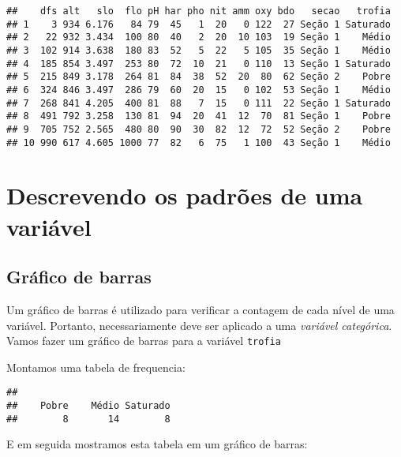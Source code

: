 \documentclass[
]{book}
\newenvironment{Shaded}{\begin{snugshade}}{\end{snugshade}}
\newcommand{\KeywordTok}[1]{\textcolor[rgb]{0.13,0.29,0.53}{\textbf{#1}}}
\newcommand{\NormalTok}[1]{#1}
\newcommand{\OperatorTok}[1]{\textcolor[rgb]{0.81,0.36,0.00}{\textbf{#1}}}
\newcommand{\StringTok}[1]{\textcolor[rgb]{0.31,0.60,0.02}{#1}}
\begin{document}
\begin{verbatim}
##    dfs alt   slo  flo pH har pho nit amm oxy bdo   secao   trofia
## 1    3 934 6.176   84 79  45   1  20   0 122  27 Seção 1 Saturado
## 2   22 932 3.434  100 80  40   2  20  10 103  19 Seção 1    Médio
## 3  102 914 3.638  180 83  52   5  22   5 105  35 Seção 1    Médio
## 4  185 854 3.497  253 80  72  10  21   0 110  13 Seção 1 Saturado
## 5  215 849 3.178  264 81  84  38  52  20  80  62 Seção 2    Pobre
## 6  324 846 3.497  286 79  60  20  15   0 102  53 Seção 1    Médio
## 7  268 841 4.205  400 81  88   7  15   0 111  22 Seção 1 Saturado
## 8  491 792 3.258  130 81  94  20  41  12  70  81 Seção 1    Pobre
## 9  705 752 2.565  480 80  90  30  82  12  72  52 Seção 2    Pobre
## 10 990 617 4.605 1000 77  82   6  75   1 100  43 Seção 1    Médio
\end{verbatim}

\hypertarget{descrevendo-os-padruxf5es-de-uma-variuxe1vel}{%
\section{Descrevendo os padrões de uma variável}\label{descrevendo-os-padruxf5es-de-uma-variuxe1vel}}

\hypertarget{gruxe1fico-de-barras}{%
\subsection{Gráfico de barras}\label{gruxe1fico-de-barras}}

Um gráfico de barras é utilizado para verificar a contagem de cada nível de uma variável. Portanto, necessariamente deve ser aplicado a uma \emph{variável categórica}. Vamos fazer um gráfico de barras para a variável \texttt{trofia}

Montamos uma tabela de frequencia:

\begin{Shaded}
\end{Shaded}

\begin{verbatim}
## 
##    Pobre    Médio Saturado 
##        8       14        8
\end{verbatim}

E em seguida mostramos esta tabela em um gráfico de barras:
\end{document}
